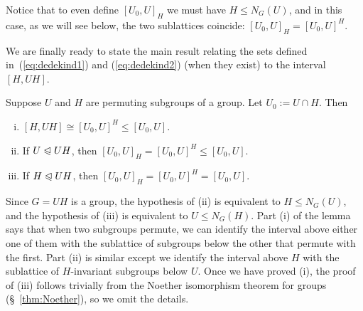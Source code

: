 Notice that to even
define $[U_0, U]_H$ we must have $H\leq N_G(U)$, and in this case, as we will
see below, the two sublattices coincide: 
$[U_0, U]_H  =  [U_0, U]^H$.  

We are finally ready to state the main result relating the sets defined
in~(\ref{eq:dedekind1}) and (\ref{eq:dedekind2}) (when they
exist) to the interval $[H, UH]$.
\begin{lemma}
  \label{lemma-wjd-4}
Suppose $U$ and $H$ are permuting subgroups of a group. %
Let $U_0 := U\cap H$.  Then
\begin{enumerate}[(i)]
\item $[H, UH]  \cong  [U_0, U]^H \leq [U_0, U]$.
\item If $U \trianglelefteqslant UH$, then  $[U_0, U]_H  = [U_0, U]^H \leq [U_0, U]$.
\item If $H \trianglelefteqslant UH$,  then  $[U_0, U]_H  = [U_0, U]^H = [U_0, U]$.
\end{enumerate}
\end{lemma}
\begin{remarks}
Since $G=UH$ is a group, the hypothesis of (ii) is equivalent to
$H\leq N_G(U)$, and the hypothesis of (iii) is equivalent to $U\leq N_G(H)$.
Part (i) of the lemma says that when two subgroups permute, we can
identify the interval above either one of them with the sublattice of
subgroups below the other that permute with the first.
Part (ii) is similar except we identify the interval above $H$ with
the  sublattice of $H$-invariant subgroups below $U$.  Once we have proved (i), the
proof of (iii) follows trivially from the Noether isomorphism theorem for
groups (\S~\ref{thm:Noether}), so we omit the details.
\end{remarks}

